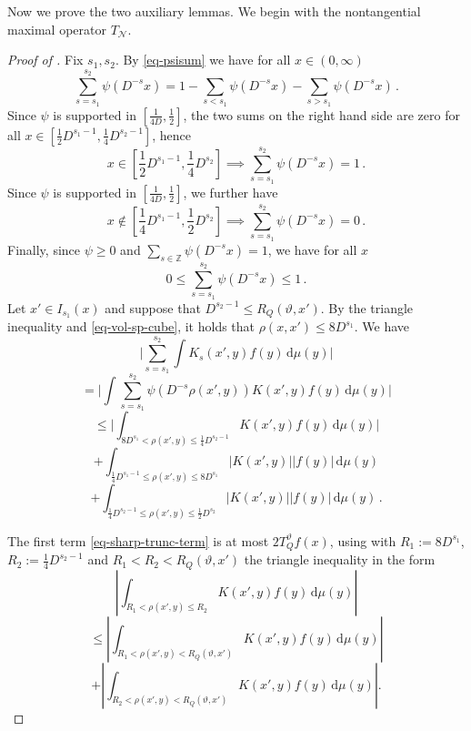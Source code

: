 \documentclass[10pt,a4paper]{article}
\theoremstyle{plain}
\theoremstyle{definition}
\numberwithin{equation}{subsection}
\newcommand{\tQ}{{Q}}
\newcommand{\mfa}{{\vartheta}}
\newcommand{\proves}[1]{}
\newcommand{\leanok}{}
\begin{document}
Now we prove the two auxiliary lemmas. We begin with the nontangential maximal operator $T_{\mathcal{N}}$.

\begin{proof}[Proof of ]
    \leanok
    \proves{nontangential-operator-bound}
    Fix $s_1, s_2$. By \eqref{eq-psisum} we have for all $x \in (0, \infty)$
    $$
        \sum_{s = s_1}^{s_2} \psi(D^{-s}x) = 1 - \sum_{s < s_1} \psi(D^{-s}x) - \sum_{s > s_1} \psi(D^{-s}x)\,.
    $$
    Since $\psi$ is supported in $[\frac{1}{4D}, \frac{1}{2}]$, the two sums on the right hand side are zero for all $x \in [\frac{1}{2}D^{s_1-1}, \frac{1}{4} D^{s_2 - 1}]$, hence
    $$
        x \in [\frac{1}{2}D^{s_1-1}, \frac{1}{4} D^{s_2}] \implies \sum_{s = s_1}^{s_2} \psi(D^{-s}x) = 1\,.
    $$
    Since $\psi$ is supported in $[\frac{1}{4D}, \frac{1}{2}]$, we further have
    $$
        x \notin [\frac{1}{4}D^{s_1 - 1}, \frac{1}{2}D^{s_2}] \implies \sum_{s = s_1}^{s_2} \psi(D^{-s}x) = 0\,.
    $$
    Finally, since $\psi \ge 0$ and $\sum_{s \in \mathbb{Z}} \psi(D^{-s}x) = 1$, we have for all $x$
    $$
        0 \le \sum_{s = s_1}^{s_2} \psi(D^{-s}x) \le 1\,.
    $$
    Let $x' \in I_{s_1}(x)$ and suppose that $D^{s_2 - 1} \le R_Q(\mfa, x')$. By the triangle inequality and \eqref{eq-vol-sp-cube}, it holds that $\rho(x,x') \le 8D^{s_1}$. We have
    $$
        \Bigg|\sum_{s = s_1}^{s_2} \int K_s(x',y) f(y) \, \mathrm{d}\mu(y)\Bigg|
    $$
    $$
        = \Bigg|\int \sum_{s = s_1}^{s_2} \psi(D^{-s}\rho(x',y)) K(x',y) f(y) \, \mathrm{d}\mu(y)\Bigg|
    $$
    \begin{equation}
        \label{eq-sharp-trunc-term}
        \le \Bigg| \int_{8D^{s_1} < \rho(x',y) \le \frac{1}{4}D^{s_2-1}} K(x',y) f(y) \, \mathrm{d}\mu(y) \Bigg|
    \end{equation}
    \begin{equation}
        \label{eq-lower-bound-term}
        + \int_{\frac{1}{4}D^{s_1-1} \le \rho(x',y) \le 8D^{s_1}} |K(x', y)| |f(y)| \, \mathrm{d}\mu(y)
    \end{equation}
    \begin{equation}
        \label{eq-upper-bound-term}
        + \int_{\frac{1}{4}D^{s_2-1} \le \rho(x',y) \le \frac{1}{2}D^{s_2}} |K(x', y)| |f(y)| \, \mathrm{d}\mu(y)\,.
    \end{equation}

    The first term \eqref{eq-sharp-trunc-term} is at most $2T_{\tQ}^\mfa f(x)$, using with $R_1 := 8D^{s_1}$, $R_2 := \frac{1}{4}D^{s_2-1}$ and $R_1 < R_2 < R_{\tQ}(\mfa,x')$ the triangle inequality in the form
    \begin{equation}
        \left|\int_{R_1 < \rho(x',y) \le R_2} K(x',y) f(y) \, \mathrm{d}\mu(y) \right|
    \end{equation}
    \begin{equation}
        \le \left|\int_{R_1 < \rho(x',y) < R_{\tQ}(\mfa,x')} K(x',y) f(y) \, \mathrm{d}\mu(y) \right|
    \end{equation}
    \begin{equation}
        + \left|\int_{R_2 < \rho(x',y) < R_{\tQ}(\mfa,x')} K(x',y) f(y) \, \mathrm{d}\mu(y) \right|.
    \end{equation}


\end{proof}
\end{document}
